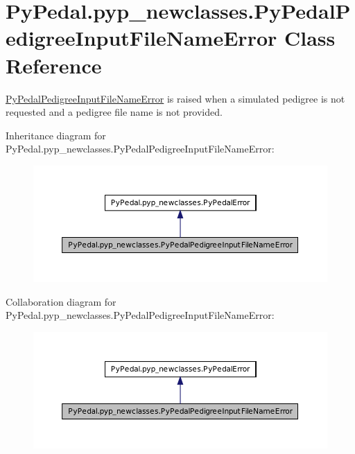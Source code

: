 \hypertarget{classPyPedal_1_1pyp__newclasses_1_1PyPedalPedigreeInputFileNameError}{
\section{PyPedal.pyp\_\-newclasses.PyPedalPedigreeInputFileNameError Class Reference}
\label{classPyPedal_1_1pyp__newclasses_1_1PyPedalPedigreeInputFileNameError}
}


\hyperlink{classPyPedal_1_1pyp__newclasses_1_1PyPedalPedigreeInputFileNameError}{PyPedalPedigreeInputFileNameError} is raised when a simulated pedigree is not requested and a pedigree file name is not provided.  




Inheritance diagram for PyPedal.pyp\_\-newclasses.PyPedalPedigreeInputFileNameError:\nopagebreak
\begin{figure}[H]
\begin{center}
\leavevmode
\includegraphics[width=400pt]{classPyPedal_1_1pyp__newclasses_1_1PyPedalPedigreeInputFileNameError__inherit__graph}
\end{center}
\end{figure}


Collaboration diagram for PyPedal.pyp\_\-newclasses.PyPedalPedigreeInputFileNameError:\nopagebreak
\begin{figure}[H]
\begin{center}
\leavevmode
\includegraphics[width=400pt]{classPyPedal_1_1pyp__newclasses_1_1PyPedalPedigreeInputFileNameError__coll__graph}
\end{center}
\end{figure}
